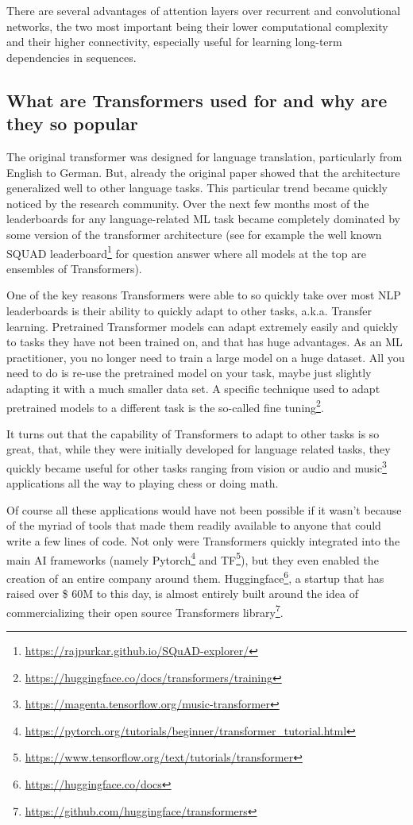 \documentclass{article}
\begin{document}
There are several advantages of attention layers over recurrent and convolutional networks, the two most important being their lower computational complexity and their higher connectivity, especially useful for learning long-term dependencies in sequences.

\subsection{What are Transformers used for and why are they so popular}

The original transformer was designed for language translation, particularly from English to German. But, already the original paper showed that the architecture generalized well to other language tasks. This particular trend became quickly noticed by the research community. Over the next few months most of the leaderboards for any language-related ML task became completely dominated by some version of the transformer architecture (see for example the well known SQUAD leaderboard\footnote{\url{https://rajpurkar.github.io/SQuAD-explorer/}} for question answer where all models at the top are ensembles of Transformers).

One of the key reasons Transformers were able to so quickly take over most NLP leaderboards is their ability to quickly adapt to other tasks, a.k.a. Transfer learning. Pretrained Transformer models can adapt extremely easily and quickly to tasks they have not been trained on, and that has huge advantages. As an ML practitioner, you no longer need to train a large model on a huge dataset. All you need to do is re-use the pretrained model on your task, maybe just slightly adapting it with a much smaller data set. A specific technique used to adapt pretrained models to a different task is the so-called fine tuning\footnote{\url{https://huggingface.co/docs/transformers/training}}.

It turns out that the capability of Transformers to adapt to other tasks is so great, that, while they were initially developed for language related tasks, they quickly became useful for other tasks ranging from vision\cite{khan2022transformers} or audio and music\footnote{\url{https://magenta.tensorflow.org/music-transformer}} applications all the way to playing chess\cite{noever2020chess} or doing math\cite{noorbakhsh2021pretrained}.

Of course all these applications would have not been possible if it wasn’t because of the myriad of tools that made them readily available to anyone that could write a few lines of code. Not only were Transformers quickly integrated into the main AI frameworks (namely Pytorch\footnote{\url{https://pytorch.org/tutorials/beginner/transformer_tutorial.html}} and TF\footnote{\url{https://www.tensorflow.org/text/tutorials/transformer}}), but they even enabled the creation of an entire company around them. Huggingface\footnote{\url{https://huggingface.co/docs}}, a startup that has raised over \$ 60M to this day, is almost entirely built around the idea of commercializing their open source Transformers library\footnote{\url{https://github.com/huggingface/transformers}}.
\end{document}
